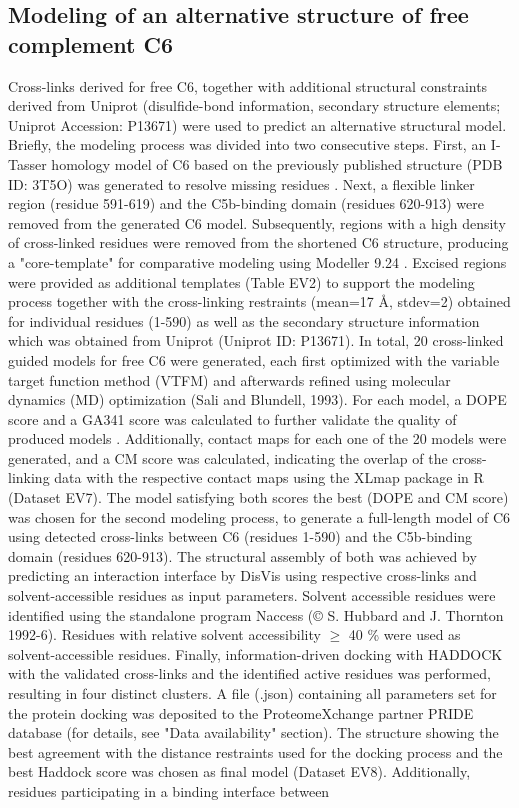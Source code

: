 \subsection*{Modeling of an alternative structure of free complement C6} Cross-links derived for free C6, together with additional structural constraints derived from Uniprot (di\-sulfide-bond information, secondary structure elements; Uniprot Accession: P13671) were used to predict an alternative structural model. Briefly, the modeling process was divided into two consecutive steps. First, an I-Tasser homology model of C6 based on the previously published structure (PDB ID: 3T5O) was generated to resolve missing residues \cite{Yang_2015}. Next, a flexible linker region (residue 591-619) and the C5b-binding domain (residues 620-913) were removed from the generated C6 model. Subsequently, regions with a high density of cross-linked residues were removed from the shortened C6 structure, producing a "core-template" for comparative modeling using Modeller 9.24 \cite{Webb_2016}. Excised regions were provided as additional templates (Table EV2) to support the modeling process together with the cross-linking restraints (mean=17 Å, stdev=2) obtained for individual residues (1-590) as well as the secondary structure information which was obtained from Uniprot (Uniprot ID: P13671). In total, 20 cross-linked guided models for free C6 were generated, each first optimized with the variable target function method (VTFM) and afterwards refined using molecular dynamics (MD) optimization (Sali and Blundell, 1993). For each model, a DOPE score and a GA341 score was calculated to further validate the quality of produced models \cite{John_2003, Melo_2002, Shen_2006}. Additionally, contact maps for each one of the 20 models were generated, and a CM score \cite{Schweppe_2016} was calculated, indicating the overlap of the cross-linking data with the respective contact maps using the XLmap package in R \cite{Schweppe_2016} (Dataset EV7). The model satisfying both scores the best (DOPE and CM score) was chosen for the second modeling process, to generate a full-length model of C6 using detected cross-links between C6 (residues 1-590) and the C5b-binding domain (residues 620-913). The structural assembly of both was achieved by predicting an interaction interface by DisVis \cite{van_Zundert_2015} using respective cross-links and solvent-accessible residues as input parameters. Solvent accessible residues were identified using the standalone program Naccess (© S. Hubbard and J. Thornton 1992-6). Residues with relative solvent accessibility $\geq$ 40 \% were used as solvent-accessible residues. Finally, information-driven docking with HADDOCK \cite{Karaca_2011, van_Zundert_2016} with the validated cross-links and the identified active residues was performed, resulting in four distinct clusters. A file (.json) containing all parameters set for the protein docking was deposited to the ProteomeXchange partner PRIDE database (for details, see "Data availability" section). The structure showing the best agreement with the distance restraints used for the docking process and the best Haddock score was chosen as final model (Dataset EV8). Additionally, residues participating in a binding interface between 